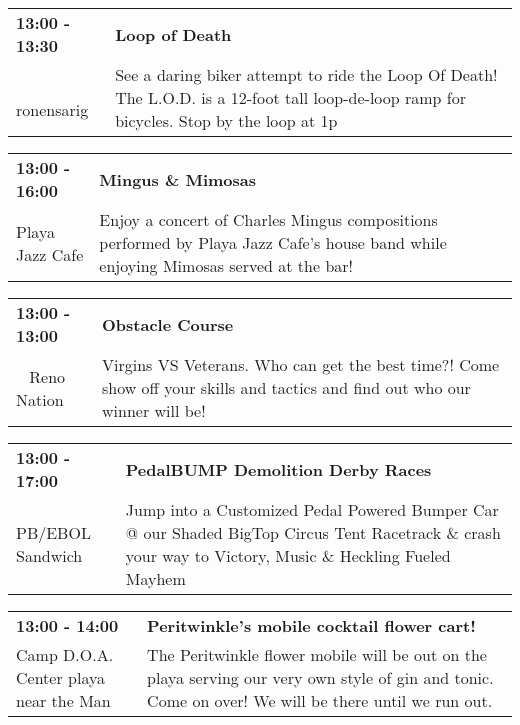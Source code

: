 \begin{tabular}{ p{1in} p{2.2in} }
    \textbf{13:00 - 13:30} & \textbf{Loop of Death} \\
    ~ \newline ronensarig & See a daring biker attempt to ride the Loop Of Death! The L.O.D. is a 12-foot tall loop-de-loop ramp for bicycles. Stop by the loop at 1p \\
    \hline 
\end{tabular}
    
\begin{tabular}{ p{1in} p{2.2in} }
    \textbf{13:00 - 16:00} & \textbf{Mingus \& Mimosas} \\
    Playa Jazz Cafe \newline  & Enjoy a concert of Charles Mingus compositions performed by Playa Jazz Cafe's house band while enjoying Mimosas served at the bar! \\
    \hline 
\end{tabular}
    
\begin{tabular}{ p{1in} p{2.2in} }
    \textbf{13:00 - 13:00} & \textbf{Obstacle Course} \\
    ~ \newline Reno Nation & Virgins VS Veterans. Who can get the best time?! Come show off your skills and tactics and find out who our winner will be! \\
    \hline 
\end{tabular}
    
\begin{tabular}{ p{1in} p{2.2in} }
    \textbf{13:00 - 17:00} & \textbf{PedalBUMP Demolition Derby Races} \\
    PB/EBOL Sandwich \newline  & Jump into a Customized Pedal Powered Bumper Car @ our Shaded BigTop Circus Tent Racetrack \& crash your way to Victory, Music \& Heckling Fueled Mayhem \\
    \hline 
\end{tabular}
    
\begin{tabular}{ p{1in} p{2.2in} }
    \textbf{13:00 - 14:00} & \textbf{Peritwinkle's mobile cocktail flower cart!} \\
    Camp D.O.A. \newline Center playa near the Man & The Peritwinkle flower mobile will be out on the playa serving our very own style of gin and tonic. Come on over! We will be there until we run out. \\
    \hline 
\end{tabular}
    
